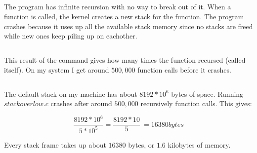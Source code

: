 \documentclass{article}
\begin{document}
\subsection{}
The program has infinite recursion with no way to break out of it. When a function is called, the kernel creates a new stack for the function. The program crashes because it uses up all the available stack memory since no stacks are freed while new ones keep piling up on eachother.

\subsection{}
This result of the command gives how many times the function recursed (called itself). On my system I get around $500,000$ function calls before it crashes.

\subsection{}
The default stack on my machine has about $8192 * 10^6$ bytes of space. Running $stackoverlow.c$ crashes after around $500,000$ recursively function calls. This gives:

$$ \frac{8192 * 10^6}{5 * 10^5} = \frac{8192 * 10}{5} ~= 16380 bytes $$

Every stack frame takes up about $16380$ bytes, or $1.6$ kilobytes of memory.
\end{document}
